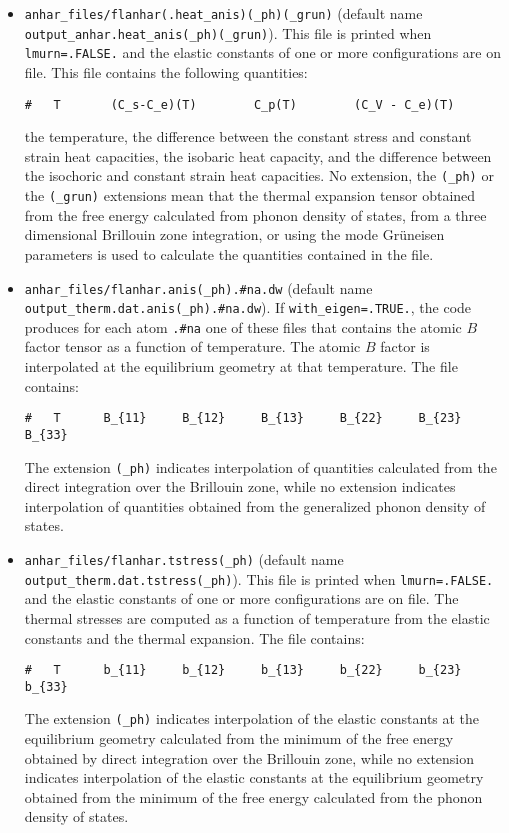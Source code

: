\documentclass[12pt,a4paper]{article}
\begin{document}
\begin{itemize}
\item 
\texttt{anhar\_files/flanhar(.heat\_anis)(\_ph)(\_grun)} 
(default name \\ \texttt{output\_anhar.heat\_anis(\_ph)(\_grun)}). 
This file is printed when \texttt{lmurn=.FALSE.} and  the elastic
constants of one or more configurations are on file.
This file contains the following quantities:
\begin{verbatim}
#   T       (C_s-C_e)(T)        C_p(T)        (C_V - C_e)(T)    
\end{verbatim}
the temperature, the difference between the constant stress and constant
strain heat capacities, the isobaric heat capacity, and the difference
between the isochoric and constant strain heat capacities. 
No extension, the \texttt{(\_ph)} or the \texttt{(\_grun)}
extensions mean that the thermal expansion tensor obtained from the
free energy calculated from phonon density of states,
from a three dimensional Brillouin zone integration, or using the
mode Gr\"uneisen parameters is used to calculate the quantities 
contained in the file.

\item
\texttt{anhar\_files/flanhar.anis(\_ph).\#na.dw} (default name
\texttt{output\_therm.dat.anis(\_ph).\#na.dw}).
If \texttt{with\_eigen=.TRUE.}, the code produces for each atom 
\texttt{.\#na} one of these
files that contains the atomic $B$ factor tensor as a function of
temperature. The atomic $B$ factor is interpolated at the equilibrium
geometry at that temperature. The file contains:
\begin{verbatim}
#   T      B_{11}     B_{12}     B_{13}     B_{22}     B_{23}     B_{33}
\end{verbatim}
The extension \texttt{(\_ph)} indicates interpolation of
quantities calculated from the direct integration over the Brillouin zone,
while no extension indicates interpolation of quantities obtained
from the generalized phonon density of states.


\item
\texttt{anhar\_files/flanhar.tstress(\_ph)} (default name 
\texttt{output\_therm.dat.tstress(\_ph)}).
This file is printed when \texttt{lmurn=.FALSE.} and the elastic constants 
of one or more configurations are on file.
The thermal stresses are computed as a function of temperature from the
elastic constants and the thermal expansion.
The file contains:
\begin{verbatim}
#   T      b_{11}     b_{12}     b_{13}     b_{22}     b_{23}     b_{33}
\end{verbatim}
The extension \texttt{(\_ph)} indicates interpolation of
the elastic constants at the equilibrium geometry calculated from the 
minimum of the free energy obtained by direct integration over the 
Brillouin zone,
while no extension indicates interpolation of the elastic constants at
the equilibrium geometry obtained from the minimum of the free energy 
calculated from the phonon density of states.


\end{itemize}
\end{document}
